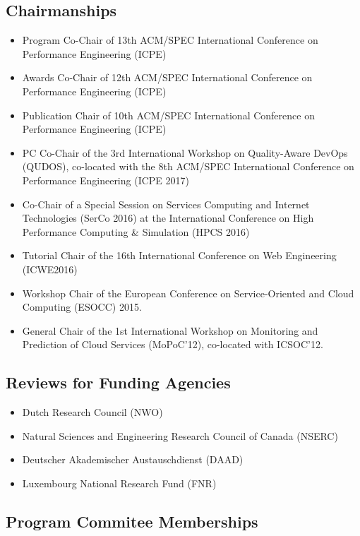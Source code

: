 \documentclass[paper=letter,fontsize=11pt]{scrartcl} %
\begin{document}
\subsection*{Chairmanships}
\begin{itemize}
\item Program Co-Chair of 13th ACM/SPEC International Conference on Performance Engineering (ICPE) 
\item Awards Co-Chair of 12th ACM/SPEC International Conference on Performance Engineering (ICPE)
\item Publication Chair of 10th ACM/SPEC International Conference on Performance Engineering (ICPE)
\item PC Co-Chair of the  3rd International Workshop on Quality-Aware DevOps (QUDOS), co-located with the  8th ACM/SPEC International Conference on Performance Engineering (ICPE 2017)
\item Co-Chair of a Special Session on Services Computing and Internet Technologies (SerCo 2016) at the International Conference on High Performance Computing \& Simulation (HPCS 2016)
\item Tutorial Chair of the 16th International Conference on Web Engineering (ICWE2016)
\item Workshop Chair of the European Conference on Service-Oriented
and Cloud Computing (ESOCC) 2015.
\item General Chair of the 1st International Workshop on Monitoring and
Prediction of Cloud Services (MoPoC'12), co-located with ICSOC'12.
\end{itemize}


\subsection*{Reviews for Funding Agencies}

\begin{itemize}
	\item Dutch Research Council (NWO)
  \item Natural Sciences and Engineering Research Council of Canada (NSERC)
	\item Deutscher Akademischer Austauschdienst (DAAD)
	\item Luxembourg National Research Fund (FNR)
\end{itemize}

\subsection*{Program Commitee Memberships}
\end{document}
